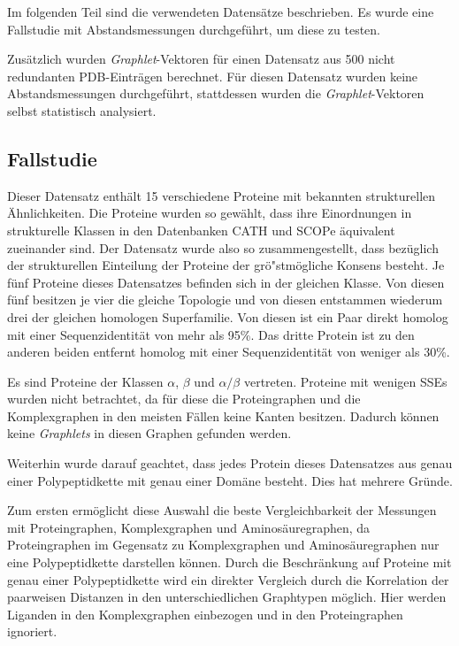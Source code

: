 \documentclass{report}
\begin{document}
Im folgenden Teil sind die verwendeten Datens\"atze beschrieben. Es wurde eine Fallstudie mit Abstandsmessungen durchgef\"uhrt, um diese zu testen.

Zus\"atzlich wurden \textit{Graphlet}-Vektoren f\"ur einen Datensatz aus 500 nicht redundanten PDB-Eintr\"agen berechnet. F\"ur diesen Datensatz wurden keine Abstandsmessungen durchgef\"uhrt, stattdessen wurden die \textit{Graphlet}-Vektoren selbst statistisch analysiert.


\subsection{Fallstudie}


Dieser Datensatz enth\"alt 15 verschiedene Proteine mit bekannten strukturellen \"Ahnlichkeiten. Die Proteine wurden so gew\"ahlt, dass ihre Einordnungen in strukturelle Klassen in den Datenbanken CATH \cite{cath} und SCOPe \cite{scope} \"aquivalent zueinander sind.
Der Datensatz wurde also so zusammengestellt, dass bez\"uglich der strukturellen Einteilung der Proteine der gr\"o"stm\"ogliche Konsens besteht.
Je f\"unf Proteine dieses Datensatzes befinden sich in der gleichen Klasse. Von diesen f\"unf besitzen je vier die gleiche Topologie und von diesen entstammen wiederum drei der gleichen homologen Superfamilie. Von diesen ist ein Paar direkt homolog mit einer Sequenzidentit\"at von mehr als 95\%. Das dritte Protein ist zu den anderen beiden entfernt homolog mit einer Sequenzidentit\"at von weniger als 30\%.

Es sind Proteine der Klassen $\alpha$, $\beta$ und $\alpha/\beta$ vertreten. Proteine mit wenigen SSEs wurden nicht betrachtet, da f\"ur diese die Proteingraphen und die Komplexgraphen in den meisten F\"allen keine Kanten besitzen. Dadurch k\"onnen keine \textit{Graphlets} in diesen Graphen gefunden werden.

Weiterhin wurde darauf geachtet, dass jedes Protein dieses Datensatzes aus genau einer Polypeptidkette mit genau einer Dom\"ane besteht. Dies hat mehrere Gr\"unde.

Zum ersten erm\"oglicht diese Auswahl die beste Vergleichbarkeit der Messungen mit Proteingraphen, Komplexgraphen und Aminos\"auregraphen, da Proteingraphen im Gegensatz zu Komplexgraphen und Aminos\"auregraphen nur eine Polypeptidkette darstellen k\"onnen. Durch die Beschr\"ankung auf Proteine mit genau einer Polypeptidkette wird ein direkter Vergleich durch die Korrelation der paarweisen Distanzen in den unterschiedlichen Graphtypen m\"oglich. Hier werden Liganden in den Komplexgraphen einbezogen und in den Proteingraphen ignoriert.
\end{document}

